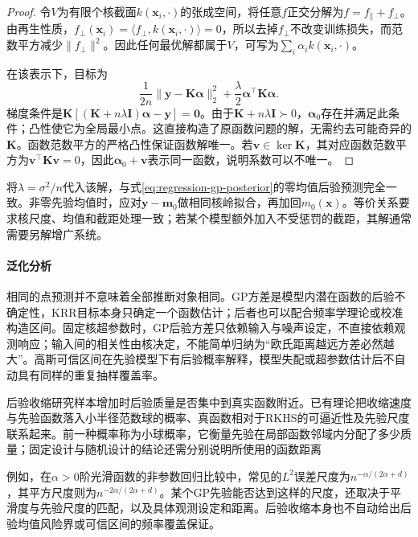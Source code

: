 \begin{proof}
令$V$为有限个核截面$k(\bm{x}_i,\cdot)$的张成空间，将任意$f$正交分解为$f=f_{\parallel}+f_{\perp}$。由再生性质，$f_{\perp}(\bm{x}_i)=\langle f_{\perp},k(\bm{x}_i,\cdot)\rangle=0$，所以去掉$f_{\perp}$不改变训练损失，而范数平方减少$\lVert f_{\perp}\rVert^2$。因此任何最优解都属于$V$，可写为$\sum_i\alpha_i k(\bm{x}_i,\cdot)$。

在该表示下，目标为
\[
  \frac1{2n}\lVert\bm{y}-\bm{K}\bm{\alpha}\rVert_2^2
       +\frac{\lambda}{2}\bm{\alpha}^{\top}\bm{K}\bm{\alpha}.
\]
梯度条件是$\bm{K}[(\bm{K}+n\lambda\bm{I})\bm{\alpha}-\bm{y}]=\bm{0}$。由于$\bm{K}+n\lambda\bm{I}\succ0$，$\bm{\alpha}_0$存在并满足此条件；凸性使它为全局最小点。这直接构造了原函数问题的解，无需约去可能奇异的$\bm{K}$。函数范数平方的严格凸性保证函数解唯一。若$\bm{v}\in\ker\bm{K}$，其对应函数范数平方为$\bm{v}^{\top}\bm{K}\bm{v}=0$，因此$\bm{\alpha}_0+\bm{v}$表示同一函数，说明系数可以不唯一。
\end{proof}

将$\lambda=\sigma^2/n$代入该解，与式\eqref{eq:regression-gp-posterior}的零均值后验预测完全一致。非零先验均值时，应对$\bm{y}-\bm{m}_0$做相同核岭拟合，再加回$m_0(\bm{x})$。等价关系要求核尺度、均值和截距处理一致；若某个模型额外加入不受惩罚的截距，其解通常需要另解增广系统。

\paragraph{泛化分析}
相同的点预测并不意味着全部推断对象相同。GP方差是模型内潜在函数的后验不确定性，KRR目标本身只确定一个函数估计；后者也可以配合频率学理论或校准构造区间。固定核超参数时，GP后验方差只依赖输入与噪声设定，不直接依赖观测响应；输入间的相关性由核决定，不能简单归纳为“欧氏距离越远方差必然越大”。高斯可信区间在先验模型下有后验概率解释，模型失配或超参数估计后不自动具有同样的重复抽样覆盖率。

后验收缩研究样本增加时后验质量是否集中到真实函数附近。已有理论把收缩速度与先验函数落入小半径范数球的概率、真函数相对于RKHS的可逼近性及先验尺度联系起来。前一种概率称为小球概率，它衡量先验在局部函数邻域内分配了多少质量；固定设计与随机设计的结论还需分别说明所使用的函数距离

例如，在$\alpha>0$阶光滑函数的非参数回归比较中，常见的$L^2$误差尺度为$n^{-\alpha/(2\alpha+d)}$，其平方尺度则为$n^{-2\alpha/(2\alpha+d)}$。某个GP先验能否达到这样的尺度，还取决于平滑度与先验尺度的匹配，以及具体观测设定和距离。后验收缩本身也不自动给出后验均值风险界或可信区间的频率覆盖保证。

